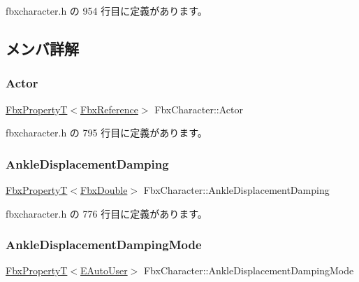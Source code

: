  fbxcharacter.\+h の 954 行目に定義があります。



\subsection{メンバ詳解}
\mbox{\label{class_fbx_character_a2d6a6f3a0ffde11982026238a04c2a0b}} 
\subsubsection{\texorpdfstring{Actor}{Actor}}
{\footnotesize\ttfamily \hyperlink{class_fbx_property_t}{Fbx\+PropertyT}$<$\hyperlink{fbxtypes_8h_a44df6a2eec915cf27cd481e5c5e48a24}{Fbx\+Reference}$>$ Fbx\+Character\+::\+Actor}



 fbxcharacter.\+h の 795 行目に定義があります。

\mbox{\label{class_fbx_character_ac8b28589ae3323eb9fed84017d421996}} 
\subsubsection{\texorpdfstring{Ankle\+Displacement\+Damping}{AnkleDisplacementDamping}}
{\footnotesize\ttfamily \hyperlink{class_fbx_property_t}{Fbx\+PropertyT}$<$\hyperlink{fbxtypes_8h_a171e72a1c46fc15c1a6c9c31948c1c5b}{Fbx\+Double}$>$ Fbx\+Character\+::\+Ankle\+Displacement\+Damping}



 fbxcharacter.\+h の 776 行目に定義があります。

\mbox{\label{class_fbx_character_ac0a3cd5def63f2246ee0b8ad4226c008}} 
\subsubsection{\texorpdfstring{Ankle\+Displacement\+Damping\+Mode}{AnkleDisplacementDampingMode}}
{\footnotesize\ttfamily \hyperlink{class_fbx_property_t}{Fbx\+PropertyT}$<$\hyperlink{class_fbx_character_a5b03462709a82a15d89ee4563a4c49df}{E\+Auto\+User}$>$ Fbx\+Character\+::\+Ankle\+Displacement\+Damping\+Mode}



